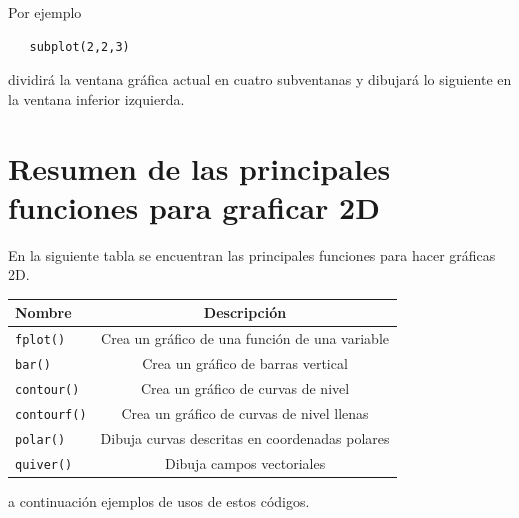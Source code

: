 \documentclass[letter,11pt]{article}
\newcommand\0{\mathbf{0}}
\begin{document}
  Por ejemplo
  \begin{lstlisting}
   subplot(2,2,3)
  \end{lstlisting}
  dividir\'a la ventana gr\'afica actual en cuatro subventanas y dibujar\'a lo siguiente en la ventana 
  inferior izquierda.
 
  \section{Resumen de las principales funciones para graficar 2D}

 En la siguiente tabla se encuentran las principales funciones para hacer gr\'aficas 2D.

 \begin{center}
 \begin{tabular}{|p{2cm}|c||}
 Nombre				& Descripci\'on			\\
 \hline 
  \texttt{fplot()}		& Crea un gr\'afico de una funci\'on de una variable\\
  \texttt{bar()}		& Crea un gr\'afico de barras vertical\\
  \texttt{contour()}		& Crea un gr\'afico de curvas de nivel\\
  \texttt{contourf()}		& Crea un gr\'afico de curvas de nivel llenas\\
  \texttt{polar()}		& Dibuja curvas descritas en coordenadas polares\\
  \texttt{quiver()}		& Dibuja campos vectoriales\\
 \end{tabular}
 \end{center}
 
 a continuaci\'on ejemplos de usos de estos c\'odigos.
 
\end{document}
